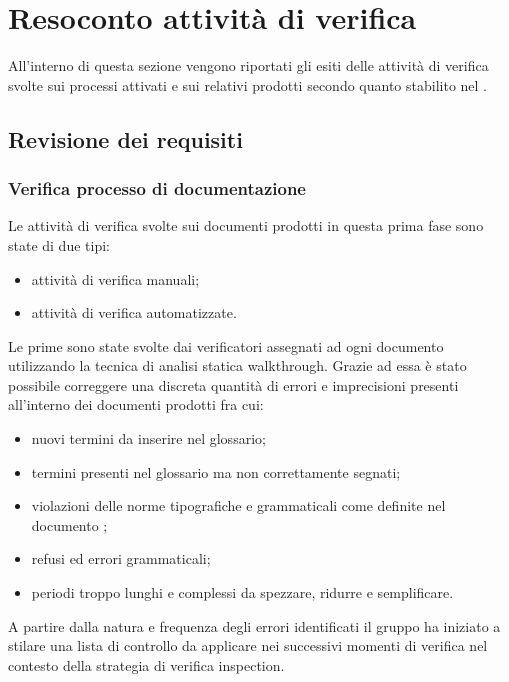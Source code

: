 	
\section{Resoconto attività di verifica}
All'interno di questa sezione vengono riportati gli esiti delle attività di verifica svolte sui processi attivati e sui relativi prodotti secondo quanto stabilito nel \PdP.
	\subsection{Revisione dei requisiti}
		\subsubsection{Verifica processo di documentazione}
		Le attività di verifica svolte sui documenti prodotti in questa prima fase sono state di due tipi:
		\begin{itemize}		
			\item attività di verifica manuali;
			\item attività di verifica automatizzate.
		\end{itemize}
		
		Le prime sono state svolte dai verificatori assegnati ad ogni documento utilizzando la tecnica di 					analisi statica walkthrough. Grazie ad essa è stato possibile correggere una discreta quantità di 					errori e imprecisioni presenti all'interno dei documenti prodotti fra cui: 
		\begin{itemize}	
			\item nuovi termini da inserire nel glossario;
			\item termini presenti nel glossario ma non correttamente segnati;
			\item violazioni delle norme tipografiche e grammaticali come definite nel documento \NdP ;
			\item refusi ed errori grammaticali;
			\item periodi troppo lunghi e complessi da spezzare, ridurre e semplificare.
		\end{itemize}
		A partire dalla natura e frequenza degli errori identificati il gruppo ha iniziato a stilare una lista
		di controllo da applicare nei successivi momenti di verifica nel contesto della strategia di verifica
		inspection.

